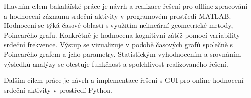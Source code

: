 Hlavním cílem bakalářské práce je návrh a realizace řešení pro offline
zpracování a hodnocení záznamu srdeční aktivity v programovém prostředí MATLAB.
Hodnocení se týká časové oblasti s využitím nelineární geometrické metody,
Poincarého grafu. Konkrétně je hodnocena kognitivní zátěž pomocí variability
srdeční frekvence. Výstup se vizualizuje v podobě časových grafů společně s
Poincarého grafem a jeho parametry. Statistickým vyhodnocením a srovnáním
výsledků analýzy se otestuje funkčnost a spolehlivost realizovaného řešení.

Dalším cílem práce je návrh a implementace řešení s GUI pro online hodnocení
srdeční aktivity v prostředí Python.

